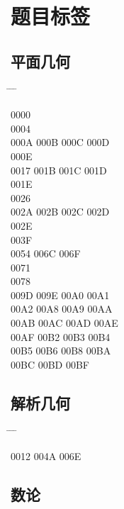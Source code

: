 \documentclass[twoside, twocolumn]{ctexart}
\newenvironment{problist}{
  \begin{center} \ttfamily \begin{tabbing}
      \hspace{50pt} \= \hspace{50pt} \= \hspace{50pt} \= \kill
  }{ \end{tabbing} \end{center} }
\begin{document}
  \balance

  \section*{题目标签}

  \subsection*{平面几何}

  \begin{problist}
    0000    \\ 0004    \\
    000A \> 000B \> 000C \> 000D \\ 000E    \\
    0017 \> 001B \> 001C \> 001D \\ 001E    \\
    0026    \\ 002A \> 002B \> 002C \> 002D \\
    002E    \\ 003F    \\
    0054  \> 006C \> 006F \\ 0071    \\
    0078    \\ 009D \> 009E \> 00A0 \> 00A1 \\
    00A2 \> 00A8 \> 00A9 \> 00AA \\ 00AB \> 00AC \> 00AD \> 00AE \\
    00AF \> 00B2 \> 00B3 \> 00B4 \\ 00B5 \> 00B6 \> 00B8 \> 00BA \\
    00BC \> 00BD \> 00BF \\
  \end{problist}

  \subsection*{解析几何}

  \begin{problist}
    0012  \> 004A \> 006E \\
  \end{problist}

  \subsection*{数论}
\end{document}
